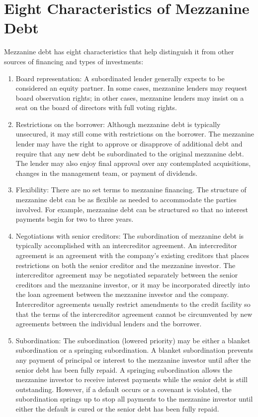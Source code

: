 \documentclass[11pt]{article}
\begin{document}
\section*{Eight Characteristics of Mezzanine Debt}
Mezzanine debt has eight characteristics that help distinguish it from other sources of financing and types of investments:

\begin{enumerate}
  \item Board representation: A subordinated lender generally expects to be considered an equity partner. In some cases, mezzanine lenders may request board observation rights; in other cases, mezzanine lenders may insist on a seat on the board of directors with full voting rights.

  \item Restrictions on the borrower: Although mezzanine debt is typically unsecured, it may still come with restrictions on the borrower. The mezzanine lender may have the right to approve or disapprove of additional debt and require that any new debt be subordinated to the original mezzanine debt. The lender may also enjoy final approval over any contemplated acquisitions, changes in the management team, or payment of dividends.

  \item Flexibility: There are no set terms to mezzanine financing. The structure of mezzanine debt can be as flexible as needed to accommodate the parties involved. For example, mezzanine debt can be structured so that no interest payments begin for two to three years.

  \item Negotiations with senior creditors: The subordination of mezzanine debt is typically accomplished with an intercreditor agreement. An intercreditor agreement is an agreement with the company's existing creditors that places restrictions on both the senior creditor and the mezzanine investor. The intercreditor agreement may be negotiated separately between the senior creditors and the mezzanine investor, or it may be incorporated directly into the loan agreement between the mezzanine investor and the company. Intercreditor agreements usually restrict amendments to the credit facility so that the terms of the intercreditor agreement cannot be circumvented by new agreements between the individual lenders and the borrower.

  \item Subordination: The subordination (lowered priority) may be either a blanket subordination or a springing subordination. A blanket subordination prevents any payment of principal or interest to the mezzanine investor until after the senior debt has been fully repaid. A springing subordination allows the mezzanine investor to receive interest payments while the senior debt is still outstanding. However, if a default occurs or a covenant is violated, the subordination springs up to stop all payments to the mezzanine investor until either the default is cured or the senior debt has been fully repaid.


\end{enumerate}
\end{document}
